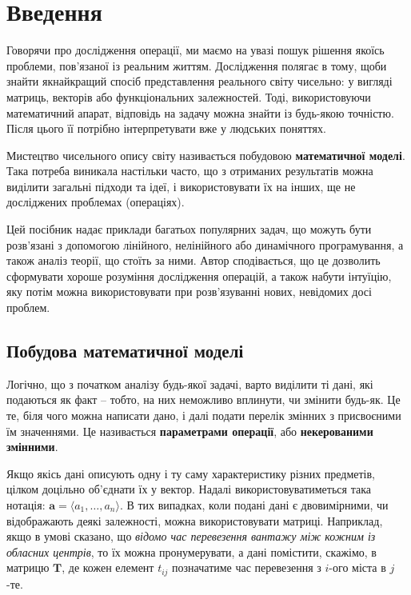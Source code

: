 \documentclass[../book.tex]{subfiles}
\begin{document}
\chapter{Введення}

Говорячи про \flqq{}дослідження операції\frqq{}, ми маємо на увазі пошук рішення якоїсь проблеми, пов'язаної із реальним життям. Дослідження полягає в тому, щоби знайти якнайкращий спосіб представлення реального світу чисельно: у вигляді матриць, векторів або функціональних залежностей. Тоді, використовуючи математичний апарат, відповідь на задачу можна знайти із будь-якою точністю. Після цього її потрібно інтерпретувати вже у \flqq{}людських\frqq{} поняттях.

Мистецтво чисельного опису світу називається побудовою \textbf{математичної моделі}. Така потреба виникала настільки часто, що з отриманих результатів можна виділити загальні підходи та ідеї, і використовувати їх на інших, ще не досліджених проблемах (операціях).

Цей посібник надає приклади багатьох популярних задач, що можуть бути розв'язані з допомогою лінійного, нелінійного або динамічного програмування, а також аналіз теорії, що стоїть за ними. Автор сподівається, що це дозволить сформувати хороше розуміння дослідження операцій, а також набути інтуїцію, яку потім можна використовувати при розв'язуванні нових, невідомих досі проблем.

\section{Побудова математичної моделі}

Логічно, що з початком аналізу будь-якої задачі, варто виділити ті дані, які подаються як факт -- тобто, на них неможливо вплинути, чи змінити будь-як. Це те, біля чого можна написати \flqq{}дано\frqq{}, і далі подати перелік змінних з присвоєними їм значеннями. Це називається \textbf{параметрами операції}, або \textbf{некерованими змінними}.

Якщо якісь дані описують одну і ту саму характеристику різних предметів, цілком доцільно об'єднати їх у вектор. Надалі використовуватиметься така нотація: $\mathbf{a} = \langle a_1, \ldots, a_n \rangle$. В тих випадках, коли подані дані є двовимірними, чи відображають деякі залежності, можна використовувати матриці. Наприклад, якщо в умові сказано, що \textit{відомо час перевезення вантажу між кожним із обласних центрів}, то їх можна пронумерувати, а дані помістити, скажімо, в матрицю $\mathbf{T}$, де кожен елемент $t_{ij}$ позначатиме час перевезення з $i$-ого міста в $j$-те.
\end{document}
